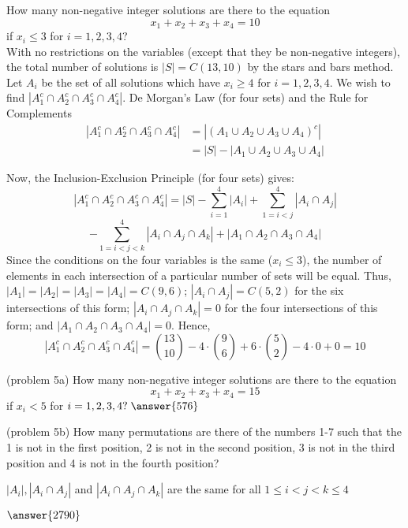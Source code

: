 \documentclass[handout]{ximera}
\begin{document}
\begin{example}[example 5]
How many non-negative integer solutions are there to the equation
\[
x_1 + x_2 + x_3 + x_4  = 10
\]
if $x_i \leq 3$ for $i = 1, 2, 3, 4$?\\
With no restrictions on the variables (except that they be non-negative integers), 
the total number of solutions is $|S| = C(13, 10)$ by the stars and bars method.
Let $A_i$ be the set of all solutions which have $x_i \geq 4$ for $i = 1, 2, 3, 4$.
We wish to find $|A_1^c \cap A_2^c \cap A_3^c \cap A_4^c|$.
De Morgan's Law (for four sets) and the Rule for Complements 
\begin{align*}
|A_1^c \cap A_2^c \cap A_3^c \cap A_4^c| &= |(A_1 \cup A_2 \cup A_3 \cup A_4)^c|\\
               &= |S| - |A_1 \cup A_2 \cup A_3 \cup A_4|
\end{align*}               
   
Now, the Inclusion-Exclusion Principle (for four sets) gives:
\[
|A_1^c \cap A_2^c \cap A_3^c \cap A_4^c| = |S| - \sum_{i = 1}^4 |A_i| + \sum_{1 = i < j}^4 |A_i \cap A_j|
\]
\[
-\sum_{1 = i < j< k }^4 |A_i \cap A_j \cap A_k| + |A_1 \cap A_2 \cap A_3 \cap A_4 |
\]
Since the conditions on the four variables is the same ($x_i \leq 3$), 
the number of elements in each intersection of a particular number of sets will be equal.
Thus, $|A_1| = |A_2| =|A_3| =|A_4| = C(9,6)$; $|A_i \cap A_j| = C(5, 2)$ for the six intersections of this form;
$|A_i \cap A_j \cap A_k| = 0$ for the four intersections of this form; and $|A_1 \cap A_2 \cap A_3 \cap A_4| = 0$.
Hence,
\[
|A_1^c \cap A_2^c \cap A_3^c \cap A_4^c| = \binom{13}{10} - 4\cdot \binom{9}{6} + 6 \cdot \binom{5}{2} - 4 \cdot 0 + 0 = 10 
\]






\end{example}

\begin{problem}(problem 5a)
How many non-negative integer solutions are there to the equation
\[
x_1 + x_2 + x_3 + x_4 = 15
\]
if $x_i < 5$ for $i = 1, 2, 3, 4? \; \answer{576}$

\end{problem}



\begin{problem}(problem 5b)
How many permutations are there of the numbers 1-7 such that the 1 is not in the first position, 2 is not in the 
second position, 3 is not in the third position and 4 is not in the fourth position?\\
\begin{hint}
$|A_i|, |A_i \cap A_j|$ and $|A_i \cap A_j \cap A_k|$ are the same for all $1 \leq i<j<k \leq 4$
\end{hint}
$\answer{2790}$
\end{problem}
\end{document}
